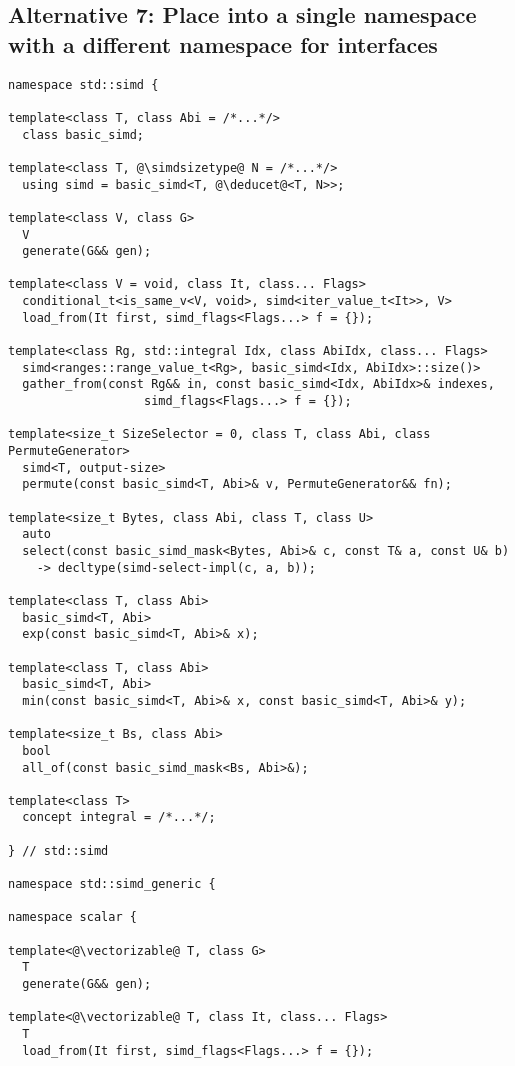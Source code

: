 \subsection{Alternative 7: Place  into a single namespace with a different namespace for \simdgeneric interfaces}

\medskip\begin{lstlisting}[style=Vc]
namespace std::simd {

template<class T, class Abi = /*...*/>
  class basic_simd;

template<class T, @\simdsizetype@ N = /*...*/>
  using simd = basic_simd<T, @\deducet@<T, N>>;

template<class V, class G>
  V
  generate(G&& gen);

template<class V = void, class It, class... Flags>
  conditional_t<is_same_v<V, void>, simd<iter_value_t<It>>, V>
  load_from(It first, simd_flags<Flags...> f = {});

template<class Rg, std::integral Idx, class AbiIdx, class... Flags>
  simd<ranges::range_value_t<Rg>, basic_simd<Idx, AbiIdx>::size()>
  gather_from(const Rg&& in, const basic_simd<Idx, AbiIdx>& indexes,
                   simd_flags<Flags...> f = {});

template<size_t SizeSelector = 0, class T, class Abi, class PermuteGenerator>
  simd<T, output-size>
  permute(const basic_simd<T, Abi>& v, PermuteGenerator&& fn);

template<size_t Bytes, class Abi, class T, class U>
  auto
  select(const basic_simd_mask<Bytes, Abi>& c, const T& a, const U& b)
    -> decltype(simd-select-impl(c, a, b));

template<class T, class Abi>
  basic_simd<T, Abi>
  exp(const basic_simd<T, Abi>& x);

template<class T, class Abi>
  basic_simd<T, Abi>
  min(const basic_simd<T, Abi>& x, const basic_simd<T, Abi>& y);

template<size_t Bs, class Abi>
  bool
  all_of(const basic_simd_mask<Bs, Abi>&);

template<class T>
  concept integral = /*...*/;

} // std::simd

namespace std::simd_generic {

namespace scalar {

template<@\vectorizable@ T, class G>
  T
  generate(G&& gen);

template<@\vectorizable@ T, class It, class... Flags>
  T
  load_from(It first, simd_flags<Flags...> f = {});


\end{lstlisting}
